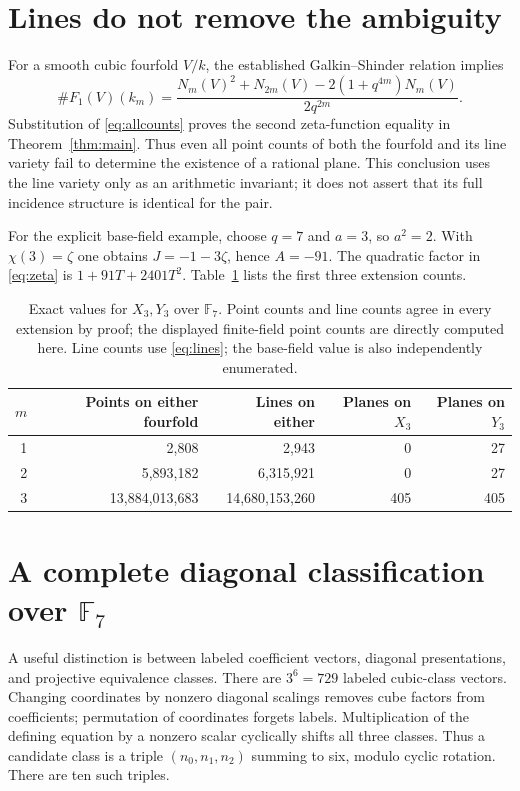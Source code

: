 \documentclass[11pt]{article}
\theoremstyle{remark}\newtheorem{remark}[theorem]{Remark}
\newcommand{\F}{\mathbb F}\newcommand{\PP}{\mathbb P}\newcommand{\Z}{\mathbb Z}
\begin{document}
\section{Lines do not remove the ambiguity}
For a smooth cubic fourfold $V/k$, the established Galkin--Shinder relation implies~\cite[\S2.3]{dlr}
\begin{equation}\label{eq:lines}
\#F_1(V)(k_m)=\frac{N_m(V)^2+N_{2m}(V)-2(1+q^{4m})N_m(V)}{2q^{2m}}.
\end{equation}
Substitution of \eqref{eq:allcounts} proves the second zeta-function equality in Theorem~\ref{thm:main}. Thus even all point counts of both the fourfold and its line variety fail to determine the existence of a rational plane. This conclusion uses the line variety only as an arithmetic invariant; it does not assert that its full incidence structure is identical for the pair.

For the explicit base-field example, choose $q=7$ and $a=3$, so $a^2=2$. With $\chi(3)=\zeta$ one obtains $J=-1-3\zeta$, hence $A=-91$. The quadratic factor in \eqref{eq:zeta} is $1+91T+2401T^2$. Table~\ref{tab:case} lists the first three extension counts.
\begin{table}[ht]\centering
\caption{Exact values for $X_3,Y_3$ over $\F_7$. Point counts and line counts agree in every extension by proof; the displayed finite-field point counts are directly computed here. Line counts use \eqref{eq:lines}; the base-field value is also independently enumerated.}\label{tab:case}
\begin{tabular}{rrrrr}\toprule
$m$&Points on either fourfold&Lines on either&Planes on $X_3$&Planes on $Y_3$\\\midrule
1&2,808&2,943&0&27\\
2&5,893,182&6,315,921&0&27\\
3&13,884,013,683&14,680,153,260&405&405\\\bottomrule
\end{tabular}
\end{table}

\section{A complete diagonal classification over $\F_7$}\label{sec:census}
A useful distinction is between labeled coefficient vectors, diagonal presentations, and projective equivalence classes. There are $3^6=729$ labeled cubic-class vectors. Changing coordinates by nonzero diagonal scalings removes cube factors from coefficients; permutation of coordinates forgets labels. Multiplication of the defining equation by a nonzero scalar cyclically shifts all three classes. Thus a candidate class is a triple $(n_0,n_1,n_2)$ summing to six, modulo cyclic rotation. There are ten such triples.
\end{document}
